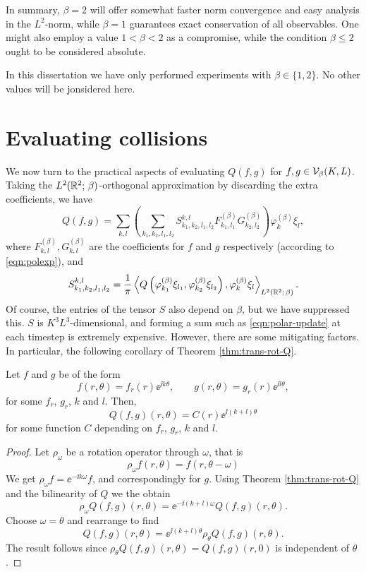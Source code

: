In summary, $\beta=2$ will offer somewhat faster norm convergence and easy analysis in the $L^2$-norm, while
$\beta=1$ guarantees exact conservation of all observables. One might also employ a value $1<\beta<2$ as a
compromise, while the condition $\beta \leq 2$ ought to be considered absolute.

In this dissertation we have only performed experiments with $\beta\in\{1,2\}$. No other values will be
jonsidered here.

\section{Evaluating collisions}
\label{sec:polar-evaluating}

We now turn to the practical aspects of evaluating $Q(f,g)$ for $f,g\in \mathcal{V}_\beta(K,L)$. Taking the
$L^2(\mathbb{R}^2;\,\beta)$-orthogonal approximation by discarding the extra coefficients, we have
\begin{equation} \label{eqn:polar-update}
    Q(f,g) = \sum_{k,l}\left(\sum_{k_1,k_2,l_1,l_2} 
             S_{k_1,k_2,l_1,l_2}^{k,l} F^{(\beta)}_{k_1,l_1} G^{(\beta)}_{k_2,l_2} \right)
             \varphi^{(\beta)}_k\xi_l,
\end{equation}
where $F^{(\beta)}_{k,l}, G^{(\beta)}_{k,l}$ are the coefficients for $f$ and $g$ respectively (according to
\eqref{eqn:polexp}), and
\[
    S_{k_1,k_2,l_1,l_2}^{k,l} = \frac{1}{\pi} \left\langle Q\left(\varphi^{(\beta)}_{k_1} \xi_{l_1},
    \varphi^{(\beta)}_{k_2} \xi_{l_2}\right), \varphi^{(\beta)}_k \xi_l \right\rangle_{L^2(\mathbb{R}^2;\,\beta)}.
\]
Of course, the entries of the tensor $S$ also depend on $\beta$, but we have suppressed this. $S$ is
$K^3L^3$-dimensional, and forming a sum such as \eqref{eqn:polar-update} at each timestep is extremely
expensive. However, there are some mitigating factors. In particular, the following corollary of Theorem
\ref{thm:trans-rot-Q}.
\begin{corollary} \label{cor:rot-Q}
Let $f$ and $g$ be of the form
\[
    f(r,\theta) = f_r(r) \ee^{\ii k \theta}, \qquad g(r,\theta) = g_r(r) \ee^{\ii l \theta},
\]
for some $f_r$, $g_r$, $k$ and $l$. Then,
\[
    Q(f,g)(r,\theta) = C(r) \ee^{\ii (k+l) \theta}
\]
for some function $C$ depending on $f_r$, $g_r$, $k$ and $l$.
\end{corollary}
\begin{proof}
Let $\rho_\omega$ be a rotation operator through $\omega$, that is
\[
    \rho_\omega f(r,\theta) = f(r,\theta-\omega)
\]
We get $\rho_\omega f = \ee^{-\ii k \omega} f$, and correspondingly for $g$. Using Theorem
\ref{thm:trans-rot-Q} and the bilinearity of $Q$ we the obtain
\[
    \rho_\omega Q(f,g)(r,\theta) = \ee^{-\ii (k+l) \omega} Q(f,g)(r,\theta).
\]
Choose $\omega=\theta$ and rearrange to find
\[
    Q(f,g)(r,\theta) = \ee^{\ii (k+l) \theta} \rho_\theta Q(f,g)(r,\theta).
\]
The result follows since $\rho_\theta Q(f,g)(r,\theta) = Q(f,g)(r,0)$ is independent of $\theta$.
\end{proof}
